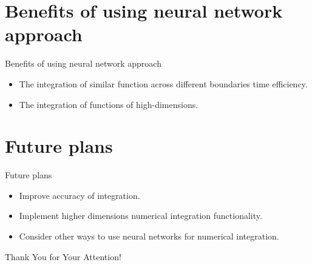 \documentclass[9pt]{beamer}
\begin{document}
\section{Benefits of using neural network approach}

\begin{frame}{Benefits of using neural network approach}

\begin{itemize}
    \item The integration of similar function across different boundaries time efficiency.
    \item The integration of functions of high-dimensions.
\end{itemize}
    
\end{frame}

\section{Future plans}

\begin{frame}{Future plans}

\begin{itemize}
    \item Improve accuracy of integration.
    \item Implement higher dimensions numerical integration functionality.
    \item Consider other ways to use neural networks for numerical integration.
\end{itemize}
    
\end{frame}

\begin{frame}
  \centering
  \vspace{1cm}
  \Large Thank You for Your Attention!
\end{frame}
\end{document}

